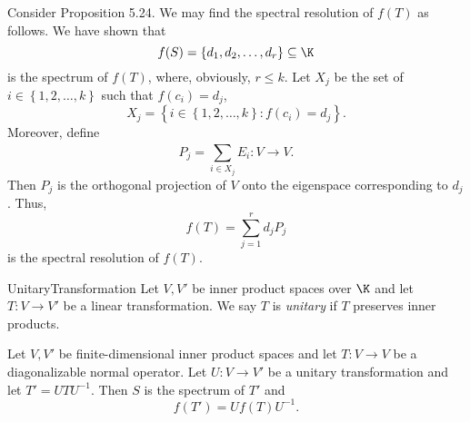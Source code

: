 \documentclass[linearalgebraII]{subfiles}
\begin{document}
    \begin{remark}
        Consider Proposition 5.24. We may find the spectral resolution of $f(T)$ as follows. We have shown that
        \begin{equation*}
            f(S) = \left\lbrace d_1,d_2,\ldots,d_r \right\rbrace \subseteq\K
        \end{equation*}
        is the spectrum of $f(T)$, where, obviously, $r\leq k$. Let $X_j$ be the set of $i\in\left\lbrace 1,2,\ldots,k \right\rbrace$ such that $f\left( c_i \right) =d_j$,
        \begin{equation*}
            X_j = \left\lbrace i\in\left\lbrace 1,2,\ldots,k \right\rbrace : f\left( c_i \right) = d_j \right\rbrace .
        \end{equation*}
        Moreover, define
        \begin{equation*}
            P_j = \sum^{}_{i\in X_j} E_i :V\to V.
        \end{equation*}
        Then $P_j$ is the orthogonal projection of $V$ onto the eigenspace corresponding to $d_j$. Thus,
        \begin{equation*}
            f(T) = \sum^{r}_{j=1} d_jP_j
        \end{equation*}
        is the spectral resolution of $f(T)$.
    \end{remark}

    \begin{definition}{Unitary}{Transformation}
        Let $V, V'$ be inner product spaces over $\K$ and let $T:V\to V'$ be a linear transformation. We say $T$ is \emph{unitary} if $T$ preserves inner products.
    \end{definition}

    \begin{prop}{}
        Let $V,V'$ be finite-dimensional inner product spaces and let $T:V\to V$ be a diagonalizable normal operator. Let $U:V\to V'$ be a unitary transformation and let $T' = UTU^{-1}$. Then $S$ is the spectrum of $T'$ and
        \begin{equation*}
            f\left( T' \right) = Uf(T)U^{-1}.
        \end{equation*}
    \end{prop}
\end{document}
